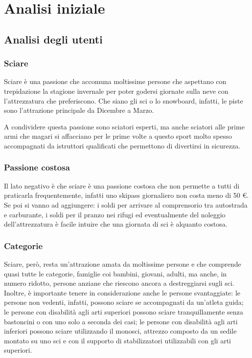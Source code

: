 \section{Analisi iniziale}

\subsection{Analisi degli utenti}

\subsubsection{Sciare}
Sciare è una passione che accomuna moltissime persone che aspettano con trepidazione la stagione invernale
per poter godersi giornate sulla neve con l'attrezzatura che preferiscono. Che siano gli sci o lo snowboard,
infatti, le piste sono l'attrazione principale da Dicembre a Marzo.

A condividere questa passione sono sciatori esperti, ma anche sciatori alle prime armi che magari si affacciano
per le prime volte a questo sport molto spesso accompagnati da istruttori qualificati che permettono di divertirsi
in sicurezza.

\subsubsection{Passione costosa}
Il lato negativo è che sciare è una passione costosa che non permette a tutti di praticarla frequentemente, infatti 
uno skipass giornaliero non costa meno di 50 \euro. Se poi si vanno ad aggiungere: i soldi per arrivare al comprensorio
tra autostrada e carburante, i soldi per il pranzo nei rifugi ed eventualmente del noleggio dell'attrezzatura è facile 
intuire che una giornata di sci è alquanto costosa.

\subsubsection{Categorie}
Sciare, però, resta un'attrazione amata da moltissime persone e che comprende quasi tutte le categorie, famiglie
coi bambini, giovani, adulti, ma anche, in numero ridotto, persone anziane che riescono ancora a destreggiarsi sugli sci.
Inoltre, è importante tenere in considerazione anche le persone svantaggiate: le persone non vedenti, infatti, possono sciare
se accompagnati da un'atleta guida; le persone con disabilità agli arti superiori possono sciare tranquillamente senza bastoncini o
con uno solo a seconda dei casi; le persone con disabilità agli arti inferiori possono sciare utilizzando il monosci, attrezzo composto
da un sedile montato su uno sci e con il supporto di stabilizzatori utilizzabili con gli arti superiori.

